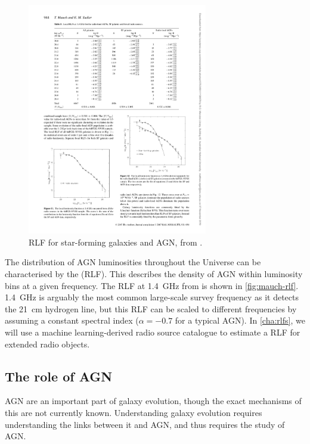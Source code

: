         \begin{figure}
            \centering
            \includegraphics[width=0.7\textwidth]{images/mauch07rlf.pdf}
            \caption{\label{fig:mauch-rlf} RLF for star-forming galaxies and AGN, from \citet{mauch07rlf}.}
        \end{figure}

        The distribution of AGN luminosities throughout the Universe can be characterised by the  (RLF). This describes the density of AGN within luminosity bins at a given frequency. The RLF at 1.4~GHz from \citet{mauch07rlf} is shown in \autoref{fig:mauch-rlf}. 1.4~GHz is arguably the most common large-scale survey frequency as it detects the 21~cm hydrogen line, but this RLF can be scaled to different frequencies by assuming a constant spectral index ($\alpha = -0.7$ for a typical AGN). In \autoref{cha:rlfs}, we will use a machine learning-derived radio source catalogue to estimate a RLF for extended radio objects.

    \subsection{The role of AGN}
    \label{sec:role-of-agn}

        AGN are an important part of galaxy evolution, though the exact mechanisms of this are not currently known. Understanding galaxy evolution requires understanding the links between it and AGN, and thus requires the study of AGN.

